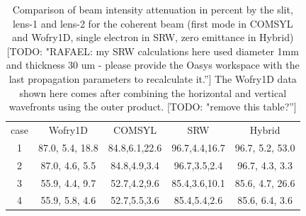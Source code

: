 \documentclass{iucr}              %
\newcommand{\todo}[1]{{\color{red}[TODO: "#1'']}}
\newcommand{\inred}[1]{{\color{red}#1}}
\begin{document}
\begin{table}[]
    \label{table:absorption}
    \caption{Comparison of beam intensity attenuation in percent by the slit, lens-1 and lens-2 for the coherent beam (first mode in COMSYL and Wofry1D, single electron in SRW, zero emittance in Hybrid)
    \todo{RAFAEL: my SRW calculations here used diameter 1mm and thickness 30 um - please provide the Oasys workspace with the last propagation parameters to recalculate it.}
    The Wofry1D data shown here comes after combining the horizontal and vertical wavefronts using the outer product. 
    \todo{remove this table?}
    }
    \centering
    \begin{tabular}{c|c|c|c|c}
case  & Wofry1D                  & COMSYL  & SRW  & Hybrid \\
1     & 
87.0, 5.4, 18.8 
& 84.8,6.1,22.6  & 96.7,4.4,16.7   & 96.7, 5.2, \inred{53.0} \\
2     & 
87.0, 4.6, 5.5 
& 84.8,4.9,3.4   & 96.7,3.5,2.4   & 96.7, 4.3, 3.3 \\
3     & 
55.9, 4.4, 9.7
& 52.7,4.2,9.6   & 85.4,3.6,10.1   & 85.6, 4.7, \inred{26.6} \\
4     & 
55.9, 5.8, 4.6 
& 52.7,5.5,3.6   & 85.4,5.4,2.6    & 85.6, 6.4, 3.6
    \end{tabular}
\end{table}
\end{document}
